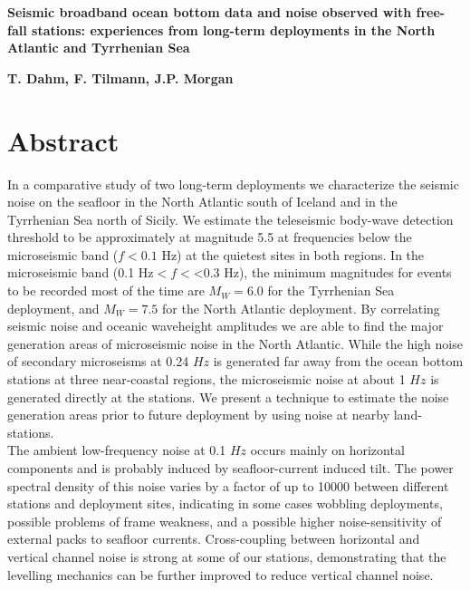 \documentclass{article}
\begin{document}
\begin{center}
{\Large\bf 
Seismic broadband ocean bottom data and noise observed with
free-fall stations:
experiences from long-term deployments in the North Atlantic and Tyrrhenian Sea
}
\end{center}
{\bf T. Dahm, F. Tilmann, J.P. Morgan}
  
\section*{Abstract}
In a comparative study of two long-term deployments 
we characterize the seismic 
noise on the seafloor in the North Atlantic  south of Iceland 
and in the Tyrrhenian Sea north of Sicily.
We estimate the teleseismic body-wave detection threshold to be
approximately at magnitude 5.5 at frequencies below the microseismic band ($f<0.1$
Hz) at the quietest sites in both regions. In the microseismic band
(0.1 Hz$<f<$<0.3 Hz), the minimum magnitudes for events to be recorded most of the
time are $M_W=6.0$ for the Tyrrhenian Sea deployment, and $M_W=7.5$
for the North Atlantic deployment.
By correlating seismic noise and 
oceanic waveheight amplitudes we are able to find the major generation 
areas of microseismic noise in the North Atlantic.
While the high noise of secondary microseisms at 0.24 $Hz$ is 
generated far away from the ocean bottom stations 
at three near-coastal regions, 
the microseismic noise at about 1 $Hz$ is generated directly at the stations.
We present a technique to estimate the noise generation areas prior 
to future deployment by using noise at nearby land-stations.
\\
The ambient low-frequency noise at 0.1 $Hz$ occurs mainly on horizontal 
components and is probably induced by seafloor-current induced tilt.
The  power spectral density of this noise
varies by a factor of up to 10000 between different stations and deployment sites, 
indicating in some cases wobbling deployments, 
possible problems of frame weakness, and 
a possible higher noise-sensitivity of external packs to 
seafloor currents.
Cross-coupling between horizontal and vertical channel
noise is strong at some of our stations, 
demonstrating that the levelling mechanics can be further 
improved to reduce vertical channel noise.
\end{document}
